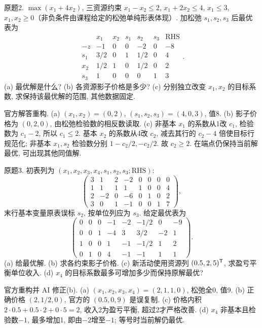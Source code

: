 \begin{exercise}\label{ass:15053-rec4-q2}
原题2. $\max(x_1+4x_2)$, 三资源约束 $x_1-x_2\le2$, $x_1+2x_2\le4$, $x_1\le3$, $x_1,x_2\ge0$（非负条件由课程给定的松弛单纯形表体现）. 加松弛 $s_1,s_2,s_3$ 后最优表为
\[
\begin{array}{c|rrrrr|r}&x_1&x_2&s_1&s_2&s_3&\mathrm{RHS}\\\hline
-z&-1&0&0&-2&0&-8\\s_1&3/2&0&1&1/2&0&4\\x_2&1/2&1&0&1/2&0&2\\s_3&1&0&0&0&1&3\end{array}.
\]
(a) 最优解是什么? (b) 各资源影子价格是多少? (c) 分别独立改变 $x_1,x_2$ 的目标系数, 求保持该最优解的范围, 其他数据固定.
\end{exercise}
\begin{solution}
官方解答重构. (a) $(x_1,x_2)=(0,2)$, $(s_1,s_2,s_3)=(4,0,3)$, 值8. (b) 影子价格为 $(0,2,0)$, 由松弛检验数的相反数读取. (c) 非基本 $x_1$ 的系数从1改 $c_1$, 检验数为 $c_1-2$, 所以 $c_1\le2$. 基本 $x_2$ 的系数从4改 $c_2$, 减去其行的 $c_2-4$ 倍使目标行规范化; 非基本 $x_1,s_2$ 检验数分别 $1-c_2/2,-c_2/2$. 故 $c_2\ge2$. 在端点仍保持当前解最优, 可出现其他同值解.
\end{solution}

\begin{exercise}\label{ass:15053-rec4-q3}
原题3. 初表列为 $(x_1,x_2,x_3,x_4,s_1,s_2,s_3;\mathrm{RHS})$:
\[
\begin{pmatrix}3&1&2&-2&0&0&0&0\\1&1&1&1&1&0&0&4\\2&-2&0&-6&0&1&0&2\\3&0&1&-1&0&0&1&7\end{pmatrix},
\]
末行基本变量原表误标 $s_2$, 按单位列应为 $s_3$. 给定最优表为
\[
\begin{pmatrix}0&0&0&-1&-2&-1/2&0&-9\\0&0&1&-4&3&3/2&-2&1\\1&0&0&1&-1&-1/2&1&2\\0&1&0&4&-1&-1&1&1\end{pmatrix}.
\]
(a) 给最优解. (b) 求各约束影子价格. (c) 新活动使用资源列 $(0.5,2,5)^{\mathsf T}$, 求盈亏平衡单位收入. (d) $x_4$ 的目标系数最多可增加多少而保持原解最优?
\end{exercise}
\begin{solution}
官方重构并 AI 修正(b). (a) $(x_1,x_2,x_3,x_4)=(2,1,1,0)$, 松弛全0, 值9. (b) 正确价格 $(2,1/2,0)$, 官方的 $(0.5,0,9)$ 是误复制. (c) 价格内积 $2\cdot0.5+0.5\cdot2+0\cdot5=2$, 收入2为盈亏平衡, 超过2才严格改善. (d) $x_4$ 非基本且检验数$-1$, 最多增加1, 即由$-2$增至$-1$; 等号时当前解仍最优.
\end{solution}


